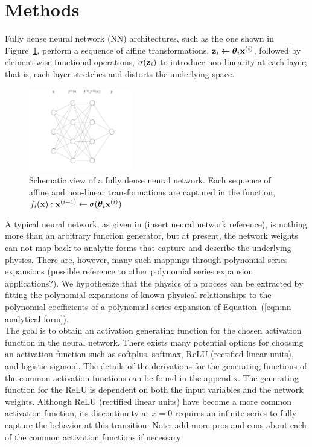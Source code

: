 \section{Methods}\label{methods}

Fully dense neural network (NN) architectures, such as the one shown in Figure~\ref{fig:nn-1}, perform a sequence of affine transformations, ${\bold z}_i \leftarrow \boldsymbol\theta_i {\bold x}^{(i)}$, followed by element-wise functional operations, $\sigma({\bold z}_i)$ to introduce non-linearity at each layer; that is, each layer stretches and distorts the underlying space.
\begin{figure}[htbp]
\begin{center}
\includegraphics[width=0.4\textwidth]{fig/neural-network-01}
\caption{Schematic view of a fully dense neural network. Each sequence of affine and non-linear transformations are captured in the function, $f_i({\bold x}): {\bold x}^{(i+1)} \leftarrow \sigma(\boldsymbol\theta_i {\bold x}^{(i)})$}
\label{fig:nn-1}
\end{center}
\end{figure}

A typical neural network, as given in (insert neural network reference), is nothing more than an arbitrary function generator, but at present, the network weights can not map back to analytic forms that capture and describe the underlying physics. There are, however, many such mappings through polynomial series expansions (possible reference to other polynomial series expansion applications?). We hypothesize that the physics of a process can be extracted by fitting the polynomial expansions of known physical relationships to the polynomial coefficients of a polynomial series expansion of Equation~(\ref{eqn:nn analytical form}). \\

The goal is to obtain an activation generating function for the chosen activation function in the neural network. There exists many potential options for choosing an activation function such as softplus, softmax, ReLU (rectified linear units), and logistic sigmoid. The details of the derivations for the generating functions of the common activation functions can be found in the appendix. The generating function for the ReLU is dependent on both the input variables and the network weights. Although ReLU (rectified linear units) have become a more common activation function, its discontinuity at $x = 0$ requires an infinite series to fully capture the behavior at this transition. {\color{red}Note: add more pros and cons about each of the common activation functions if necessary}

